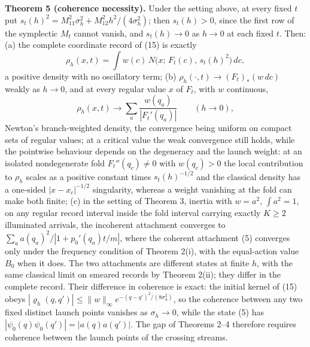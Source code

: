 \documentclass[11pt,a4paper]{article}
\begin{document}
\textbf{Theorem 5 (coherence necessity).} Under the setting above, at
every fixed \(t\) put
\(s_t(h)^2=M_{11}^2\sigma_h^2+M_{12}^2h^2/(4\sigma_h^2)\); then
\(s_t(h)>0\), since the first row of the symplectic \(M_t\) cannot
vanish, and \(s_t(h)\to0\) as \(h\to0\) at each fixed \(t\). Then: (a)
the complete coordinate record of (15) is exactly
\[\rho_h(x,t)=\int w(c)\,N\big(x;\,F_t(c),\,s_t(h)^2\big)\,dc,\tag{16}\]
a positive density with no oscillatory term; (b)
\(\rho_h(\cdot,t)\to(F_t)_*(w\,dc)\) weakly as \(h\to0\), and at every
regular value \(x\) of \(F_t\), with \(w\) continuous,
\[\rho_h(x,t)\longrightarrow\sum_a\frac{w(q_a)}{|F_t'(q_a)|}
\qquad(h\to0),\tag{17}\] Newton's branch-weighted density, the
convergence being uniform on compact sets of regular values; at a
critical value the weak convergence still holds, while the pointwise
behaviour depends on the degeneracy and the launch weight: at an
isolated nondegenerate fold \(F_t''(q_c)\neq0\) with \(w(q_c)>0\) the
local contribution to \(\rho_h\) scales as a positive constant times
\(s_t(h)^{-1/2}\) and the classical density has a one-sided
\(|x-x_c|^{-1/2}\) singularity, whereas a weight vanishing at the fold
can make both finite; (c) in the setting of Theorem 3, inertia with
\(w=a^2\), \(\int a^2=1\), on any regular record interval inside the
fold interval carrying exactly \(K\ge2\) illuminated arrivals, the
incoherent attachment converges to \(\sum_aa(q_a)^2/|1+p_0'(q_a)t/m|\),
where the coherent attachment (5) converges only under the frequency
condition of Theorem 2(i), with the equal-action value \(B_0\) when it
does. The two attachments are different states at finite \(h\), with the
same classical limit on smeared records by Theorem 2(ii); they differ in
the complete record. Their difference in coherence is exact: the initial
kernel of (15) obeys
\(|\varrho_h(q,q')|\le\|w\|_\infty e^{-(q-q')^2/(8\sigma_h^2)}\), so the
coherence between any two fixed distinct launch points vanishes as
\(\sigma_h\to0\), while the state (5) has
\(|\psi_0(q)\psi_0(q')| =|a(q)a(q')|\). The gap of Theorems 2--4
therefore requires coherence between the launch points of the crossing
streams.
\end{document}
